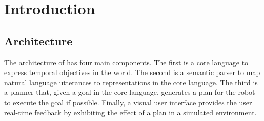 \section{Introduction}


\subsection{Architecture}

The architecture of \tool has four main components.
The first is a core language to express temporal objectives
in the world.
The second is a semantic parser to map natural language
utterances to representations in the core language.
The third is a planner that, given a goal in the core language,
generates a plan for the robot to execute the goal if possible.
Finally, a visual user interface provides the user real-time
feedback by exhibiting the effect of a plan in a simulated environment. 

